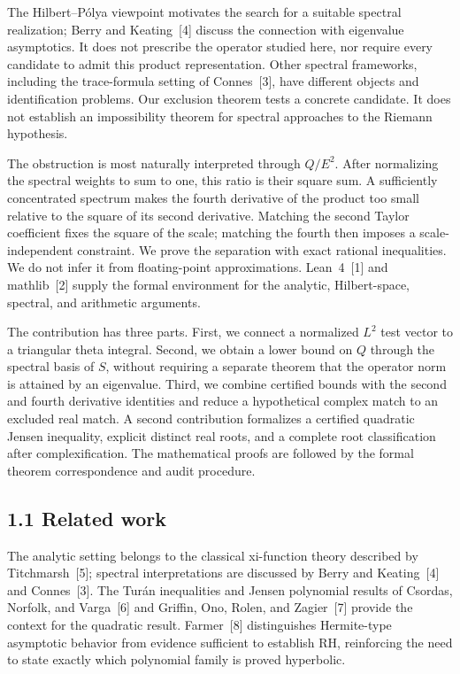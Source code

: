 \documentclass[
  11pt,
]{article}
\begin{document}
The Hilbert--Pólya viewpoint motivates the search for a suitable spectral realization; Berry and Keating~{[}4{]} discuss the connection with eigenvalue asymptotics. It does not prescribe the operator studied here, nor require every candidate to admit this product representation. Other spectral frameworks, including the trace-formula setting of Connes~{[}3{]}, have different objects and identification problems. Our exclusion theorem tests a concrete candidate. It does not establish an impossibility theorem for spectral approaches to the Riemann hypothesis.

The obstruction is most naturally interpreted through \(Q/E^{2}\). After normalizing the spectral weights to sum to one, this ratio is their square sum. A sufficiently concentrated spectrum makes the fourth derivative of the product too small relative to the square of its second derivative. Matching the second Taylor coefficient fixes the square of the scale; matching the fourth then imposes a scale-independent constraint. We prove the separation with exact rational inequalities. We do not infer it from floating-point approximations. Lean~4~{[}1{]} and mathlib~{[}2{]} supply the formal environment for the analytic, Hilbert-space, spectral, and arithmetic arguments.

The contribution has three parts. First, we connect a normalized \(L^{2}\) test vector to a triangular theta integral. Second, we obtain a lower bound on \(Q\) through the spectral basis of \(S\), without requiring a separate theorem that the operator norm is attained by an eigenvalue. Third, we combine certified bounds with the second and fourth derivative identities and reduce a hypothetical complex match to an excluded real match. A second contribution formalizes a certified quadratic Jensen inequality, explicit distinct real roots, and a complete root classification after complexification. The mathematical proofs are followed by the formal theorem correspondence and audit procedure.

\hypertarget{related-work}{%
\subsection{1.1 Related work}\label{related-work}}

The analytic setting belongs to the classical xi-function theory described by Titchmarsh~{[}5{]}; spectral interpretations are discussed by Berry and Keating~{[}4{]} and Connes~{[}3{]}. The Turán inequalities and Jensen polynomial results of Csordas, Norfolk, and Varga~{[}6{]} and Griffin, Ono, Rolen, and Zagier~{[}7{]} provide the context for the quadratic result. Farmer~{[}8{]} distinguishes Hermite-type asymptotic behavior from evidence sufficient to establish RH, reinforcing the need to state exactly which polynomial family is proved hyperbolic.
\end{document}
